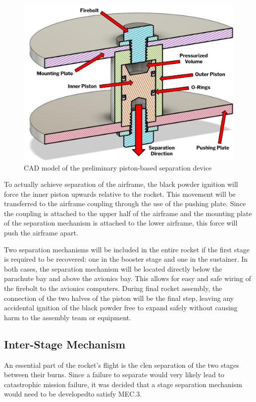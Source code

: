 \begin{figure}
    \centering
    \includegraphics[width=0.8\linewidth]{images/sep-cad}
    \caption{CAD model of the preliminary piston-based separation device}
    \label{figure:sep-cad}
\end{figure}

To actually achieve separation of the airframe, the black powder ignition will force the inner piston upwards relative to the rocket. This movement will be transferred to the airframe coupling through the use of the pushing plate. Since the coupling is attached to the upper half of the airframe and the mounting plate of the separation mechanism is attached to the lower airframe, this force will push the airframe apart.

Two separation mechanisms will be included in the entire rocket if the first stage is required to be recovered: one in the booster stage and one in the sustainer. In both cases, the separation mechanism will be located directly below the parachute bay and above the avionics bay. This allows for easy and safe wiring of the firebolt to the avionics computers. During final rocket assembly, the connection of the two halves of the piston will be the final step, leaving any accidental ignition of the black powder free to expand safely without causing harm to the assembly team or equipment.


\subsection{Inter-Stage Mechanism} \label{section:interstage-mech}

An essential part of the rocket's flight is the clen separation of the two stages between their burns. Since a failure to separate would very likely lead to catastrophic mission failure, it was decided that a stage separation mechanism would need to be developedto satisfy MEC.3.

